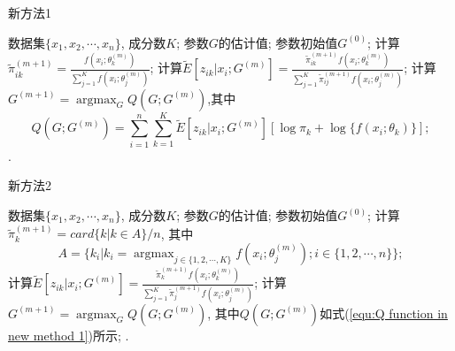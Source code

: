 \documentclass[a4paper,12pt,openany,oneside,utf-8]{ctexbook}
\begin{document}
\begin{algorithm}[h!]
  \caption{新方法1}%
  \label{alg:New method 1}
  \begin{algorithmic}[1] %
    \Require
      数据集$\{x_1, x_2, \cdots, x_n\}$, 成分数$K$;
    \Ensure
      参数$G$的估计值;
    \State 参数初始值$G^{(0)}$;
    \Repeat
      \State 计算$\tilde{\pi}_{ik}^{(m+1)}=\frac{f(x_i;\theta_k^{(m)})}{\sum_{j=1}^{K}f(x_i;\theta_j^{(m)})}$;
      \State 计算$\tilde{E}[z_{ik}|x_i;G^{(m)}]=\frac{\tilde{\pi}_{ik}^{(m+1)}f(x_{i}; \theta_{k}^{(m)})}{\sum_{j=1}^{K}\tilde{\pi}_{ij}^{(m+1)}f(x_{i}; \theta_{j}^{(m)})}$;
      \State 计算$G^{(m+1)}=\mathop{\arg\max}_{G} Q(G;G^{(m)})$,其中
      \begin{equation}
      \label{equ:Q function in new method 1}
        Q(G;G^{(m)})=\sum_{i=1}^{n} \sum_{k=1}^{K} \tilde{E}[z_{ik}|x_i;G^{(m)}] [ \log\pi_{k} + \log\{f(x_{i}; \theta_{k})\} ];
      \end{equation}
    .
  \end{algorithmic}
\end{algorithm}

\begin{algorithm}[h!]
  \caption{新方法2}%
  \label{alg:New method 2}
  \begin{algorithmic}[1] %
    \Require
      数据集$\{x_1, x_2, \cdots, x_n\}$, 成分数$K$;
    \Ensure
      参数$G$的估计值;
    \State 参数初始值$G^{(0)}$;
    \Repeat
      \State 计算$\tilde{\pi}_{k}^{(m+1)}=card\{k|k\in A\}/n$, 其中 \[ A=\{k_i|k_i=\mathop{\arg\max}_{j\in\{1, 2, \cdots, K\}} f(x_{i}; \theta_{j}^{(m)}); i\in\{1, 2, \cdots, n\}\}; \]
      \State 计算$\tilde{E}[z_{ik}|x_i;G^{(m)}]=\frac{\tilde{\pi}_{k}^{(m+1)}f(x_{i}; \theta_{k}^{(m)})}{\sum_{j=1}^{K}\tilde{\pi}_{j}^{(m+1)}f(x_{i}; \theta_{j}^{(m)})}$;
      \State 计算$G^{(m+1)}=\mathop{\arg\max}_{G} Q(G;G^{(m)})$, 其中$Q(G;G^{(m)})$如式(\ref{equ:Q function in new method 1})所示;
    .
  \end{algorithmic}
\end{algorithm}
\end{document}
